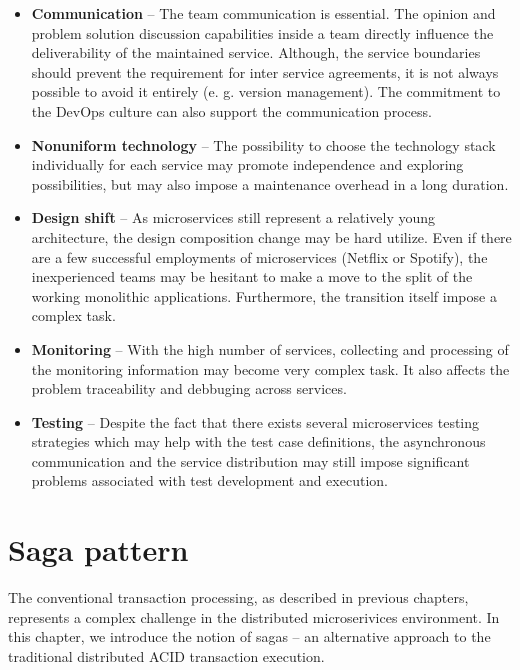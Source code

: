 \documentclass[oneside,
  digital, %
  table,   %
  lof,     %
  lot,     %
]{fithesis3}
\begin{document}
\begin{itemize}
    \item \textbf{Communication} -- The team communication is essential. The opinion and problem solution discussion capabilities inside a team directly influence the deliverability of the maintained service. Although, the service boundaries should prevent the requirement for inter service agreements, it is not always possible to avoid it entirely (e. g. version management). The commitment to the DevOps culture can also support the communication process.
    
    \item \textbf{Nonuniform technology} -- The possibility to choose the technology stack individually for each service may promote independence and exploring possibilities, but may also impose a maintenance overhead in a long duration.  
    
    \item \textbf{Design shift} -- As microservices still represent a relatively young architecture, the design composition change may be hard utilize. Even if there are a few successful employments of microservices (Netflix or Spotify), the inexperienced teams may be hesitant to make a move to the split of the working monolithic applications. Furthermore, the transition itself impose a complex task.
    
    \item \textbf{Monitoring} -- With the high number of services, collecting and processing of the monitoring information may become very complex task. It also affects the problem traceability and debbuging across services.
    
    \item \textbf{Testing} -- Despite the fact that there exists several microservices testing strategies \cite{ms_testing_strategies} which may help with the test case definitions, the asynchronous communication and the service distribution may still impose significant problems associated with test development and execution.
\end{itemize}



\clearpage
\chapter{Saga pattern}
\label{sec:saga-pattern}

The conventional transaction processing, as described in previous chapters, represents a complex challenge in the distributed microserivices environment. In this chapter, we introduce the notion of sagas -- an alternative approach to the traditional distributed ACID transaction execution.
\end{document}
